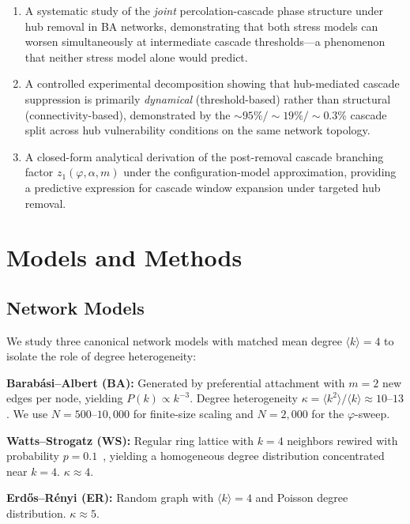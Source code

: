 \documentclass[aps,pre,twocolumn,superscriptaddress,showpacs]{revtex4-2}
\newcommand{\avg}[1]{\langle #1 \rangle}
\begin{document}
\begin{enumerate}
\item A systematic study of the \emph{joint} percolation-cascade phase structure under hub removal in BA networks, demonstrating that both stress models can worsen simultaneously at intermediate cascade thresholds---a phenomenon that neither stress model alone would predict.

\item A controlled experimental decomposition showing that hub-mediated cascade suppression is primarily \emph{dynamical} (threshold-based) rather than structural (connectivity-based), demonstrated by the ${\sim}95\%/{\sim}19\%/{\sim}0.3\%$ cascade split across hub vulnerability conditions on the same network topology.

\item A closed-form analytical derivation of the post-removal cascade branching factor $z_1(\varphi, \alpha, m)$ under the configuration-model approximation, providing a predictive expression for cascade window expansion under targeted hub removal.
\end{enumerate}

\section{Models and Methods}
\label{sec:methods}

\subsection{Network Models}

We study three canonical network models with matched mean degree $\avg{k} = 4$ to isolate the role of degree heterogeneity:

\textbf{Barab\'asi--Albert (BA):} Generated by preferential attachment with $m=2$ new edges per node, yielding $P(k) \propto k^{-3}$. Degree heterogeneity $\kappa = \avg{k^2}/\avg{k} \approx 10$--$13$. We use $N=500$--$10{,}000$ for finite-size scaling and $N=2{,}000$ for the $\varphi$-sweep.

\textbf{Watts--Strogatz (WS):} Regular ring lattice with $k=4$ neighbors rewired with probability $p=0.1$~\cite{WattsStrogatz1998}, yielding a homogeneous degree distribution concentrated near $k=4$. $\kappa \approx 4$.

\textbf{Erd\H{o}s--R\'enyi (ER):} Random graph with $\avg{k} = 4$ and Poisson degree distribution. $\kappa \approx 5$.
\end{document}
